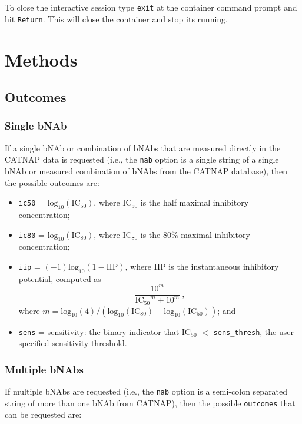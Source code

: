 \documentclass[]{article}
\providecommand{\tightlist}{%
  \setlength{\itemsep}{0pt}\setlength{\parskip}{0pt}}
\begin{document}
To close the interactive session type \texttt{exit} at the container
command prompt and hit \texttt{Return}. This will close the container
and stop its running.

\section{Methods}\label{sec:methods}

\subsection{Outcomes}\label{sec:outcomedefs}

\subsubsection{Single bNAb}\label{single-bnab}

If a single bNAb or combination of bNAbs that are measured directly in
the CATNAP data is requested (i.e., the \texttt{nab} option is a single
string of a single bNAb or measured combination of bNAbs from the CATNAP
database), then the possible outcomes are:

\begin{itemize}
\tightlist
\item
  \texttt{ic50} = \(\mbox{log}_{10}(\mbox{IC}_{50})\), where IC\(_{50}\)
  is the half maximal inhibitory concentration;
\item
  \texttt{ic80} = \(\mbox{log}_{10}(\mbox{IC}_{80})\), where IC\(_{80}\)
  is the 80\% maximal inhibitory concentration;
\item
  \texttt{iip} = \((-1)\mbox{log}_{10}(1 - \mbox{IIP})\), where IIP
  \citep[\citet{wagh2016optimal}]{shen2008dose} is the instantaneous
  inhibitory potential, computed as
  \[ \frac{10^m}{\mbox{IC$_{50}$}^m + 10^m} \ , \] where
  \(m = \mbox{log}_{10}(4) / (\mbox{log}_{10}(\mbox{IC}_{80}) - \mbox{log}_{10}(\mbox{IC}_{50}))\);
  and
\item
  \texttt{sens} = sensitivity: the binary indicator that IC\(_{50}\)
  \(<\) \texttt{sens\_thresh}, the user-specified sensitivity threshold.
\end{itemize}

\subsubsection{Multiple bNAbs}\label{multiple-bnabs}

If multiple bNAbs are requested (i.e., the \texttt{nab} option is a
semi-colon separated string of more than one bNAb from CATNAP), then the
possible \texttt{outcomes} that can be requested are:
\end{document}
